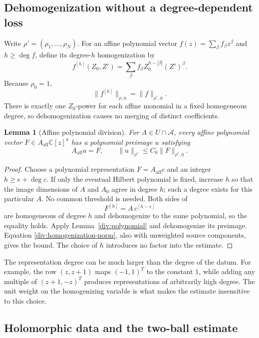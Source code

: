 \documentclass[11pt,reqno]{amsart}
\numberwithin{equation}{section}
\newtheorem{lemma}[theorem]{Lemma}
\theoremstyle{definition}
\theoremstyle{remark}
\begin{document}
\subsection{Dehomogenization without a degree-dependent loss}

Write \(\rho'=(\rho_1,\ldots,\rho_N)\). For an affine polynomial
vector \(f(z)=\sum_\beta f_\beta z^\beta\) and \(h\geq\deg f\),
define its degree-\(h\) homogenization by
\[
 f^{[h]}(Z_0,Z')
 =
 \sum_\beta f_\beta Z_0^{h-|\beta|}(Z')^\beta.
\]
Because \(\rho_0=1\),
\begin{equation}
 \|f^{[h]}\|_{\rho,\eta}=\|f\|_{\rho',\eta}.
 \label{div:homogenization-norm}
\end{equation}
There is exactly one \(Z_0\)-power for each affine monomial in a
fixed homogeneous degree, so dehomogenization causes no merging of
distinct coefficients.

\begin{lemma}[Affine polynomial division]
\label{div:affine}
For \(A\in U\cap\mathcal A\), every affine polynomial vector
\(F\in A_{\mathrm{aff}}\mathbb C[z]^a\) has a polynomial preimage
\(u\) satisfying
\[
 A_{\mathrm{aff}}u=F,\qquad
 \|u\|_{\rho'}\leq C_0\|F\|_{\rho',\eta}.
 \]
\end{lemma}

\begin{proof}
Choose a polynomial representation \(F=A_{\mathrm{aff}}c\) and
an integer \(h\geq e+\deg c\). If only the eventual Hilbert
polynomial is fixed, increase \(h\) so that the image dimensions of
\(A\) and \(A_0\) agree in degree \(h\); such a degree exists for this
particular \(A\). No common threshold is needed. Both sides of
\[
 F^{[h]}=A\,c^{[h-e]}
\]
are homogeneous of degree \(h\) and dehomogenize to the same
polynomial, so the equality holds. Apply
Lemma~\ref{div:polynomial} and dehomogenize its preimage. Equation
\eqref{div:homogenization-norm}, also with unweighted source
components, gives the bound. The choice of \(h\) introduces no
factor into the estimate.
\end{proof}

The representation degree can be much larger than the degree of
the datum. For example, the row \((z,z+1)\) maps \((-1,1)^T\) to
the constant \(1\), while adding any multiple of
\((z+1,-z)^T\) produces representations of arbitrarily high degree.
The unit weight on the homogenizing variable is what makes the
estimate insensitive to this choice.

\subsection{Holomorphic data and the two-ball estimate}
\end{document}
